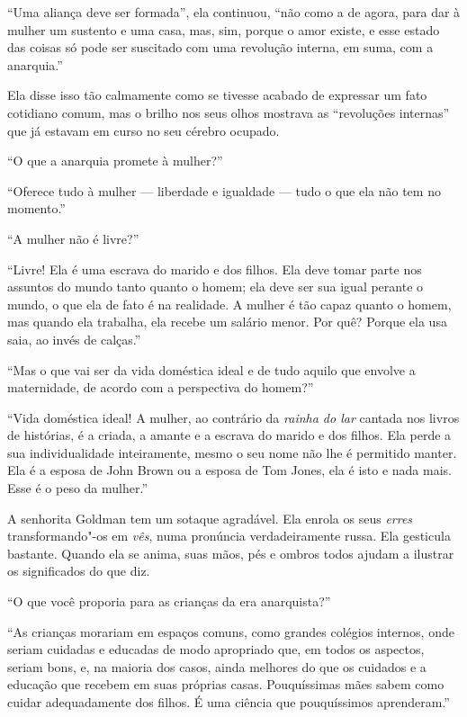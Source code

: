 ``Uma aliança deve ser formada'', ela continuou, ``não como a de agora,
para dar à mulher um sustento e uma casa, mas, sim, porque o amor
existe, e esse estado das coisas só pode ser suscitado com uma revolução
interna, em suma, com a anarquia.''\label{alianca}

Ela disse isso tão calmamente como se tivesse acabado de expressar um
fato cotidiano comum, mas o brilho nos seus olhos mostrava as
``revoluções internas'' que já estavam em curso no seu cérebro ocupado.

``O que a anarquia promete à mulher?''

``Oferece tudo à mulher --- liberdade e igualdade --- tudo o que ela não
tem no momento.''

``A mulher não é livre?''

``Livre! Ela é uma escrava do marido e dos filhos. Ela deve tomar parte
nos assuntos do mundo tanto quanto o homem; ela deve ser sua igual
perante o mundo, o que ela de fato é na realidade. A mulher é tão capaz
quanto o homem, mas quando ela trabalha, ela recebe um salário menor.
Por quê? Porque ela usa saia, ao invés de calças.''

``Mas o que vai ser da vida doméstica ideal e de tudo aquilo que envolve
a maternidade, de acordo com a perspectiva do homem?''

``Vida doméstica ideal! A mulher, ao contrário da \textit{rainha do lar} cantada
nos livros de histórias, é a criada, a amante e a escrava do marido e dos
filhos. Ela perde a sua individualidade inteiramente, mesmo o seu nome
não lhe é permitido manter. Ela é a esposa de John Brown ou a esposa de
Tom Jones, ela é isto e nada mais. Esse é o peso da mulher.'' 

A senhorita Goldman tem um sotaque agradável. Ela enrola os seus \textit{erres}
transformando"-os em \textit{vês}, numa pronúncia verdadeiramente russa. Ela
gesticula bastante. Quando ela se anima, suas mãos, pés e ombros todos
ajudam a ilustrar os significados do que diz.

``O que você proporia para as crianças da era anarquista?''

``As crianças morariam em espaços comuns, como grandes colégios
internos, onde seriam cuidadas e educadas de modo apropriado que, em
todos os aspectos, seriam bons, e, na maioria dos casos, ainda
melhores do que os cuidados e a educação que recebem em suas próprias
casas. Pouquíssimas mães sabem como cuidar adequadamente dos filhos. É
uma ciência que pouquíssimos aprenderam.''

